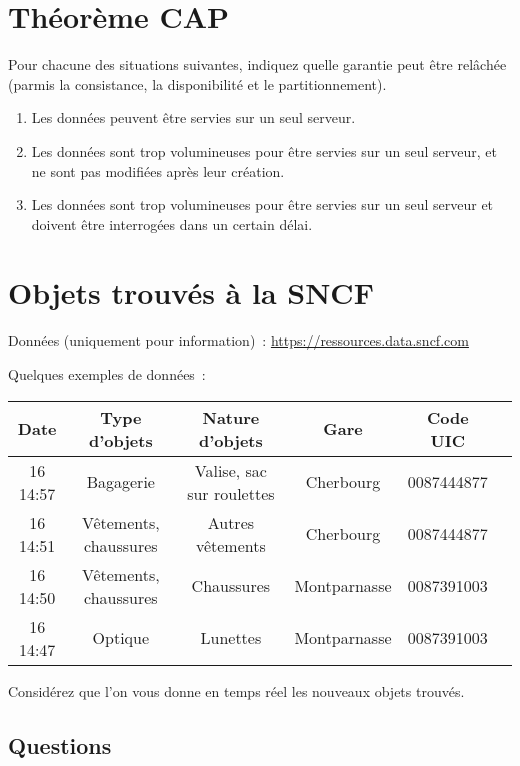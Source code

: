 \documentclass[11pt,letterpaper]{article}
\begin{document}
\section*{Théorème CAP}

Pour chacune des situations suivantes, indiquez quelle garantie peut être relâchée (parmis la consistance, la disponibilité et le partitionnement).

\begin{enumerate}
\item Les données peuvent être servies sur un seul serveur.
\item Les données sont trop volumineuses pour être servies sur un seul serveur, et ne sont pas modifiées après leur création.
\item Les données sont trop volumineuses pour être servies sur un seul serveur et doivent être interrogées dans un certain délai.
\end{enumerate}

\section*{Objets trouvés à la SNCF}

Données (uniquement pour information)~: \url{https://ressources.data.sncf.com}

Quelques exemples de données~:

\begin{tabular}{| c | c | c | c | c | c |}
\hline
Date & Type d'objets & Nature d'objets & Gare & Code UIC \\ \hline
16 14:57 & Bagagerie & Valise, sac sur roulettes & Cherbourg & 0087444877 \\ \hline
16 14:51 & Vêtements, chaussures & Autres vêtements & Cherbourg & 0087444877 \\ \hline
16 14:50 & Vêtements, chaussures & Chaussures & Montparnasse & 0087391003 \\ \hline
16 14:47 & Optique & Lunettes & Montparnasse & 0087391003 \\ \hline
\end{tabular}

Considérez que l'on vous donne en temps réel les nouveaux objets trouvés.

\subsection*{Questions}
\end{document}
